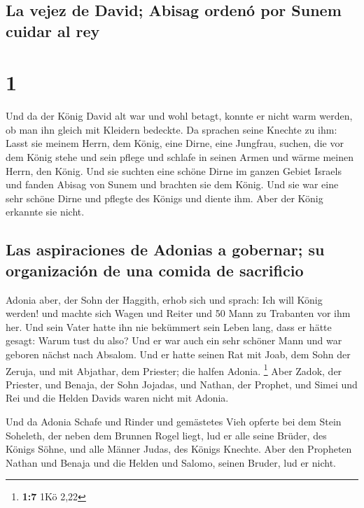 \hypertarget{la-vejez-de-david-abisag-ordenuxf3-por-sunem-cuidar-al-rey}{%
\subsection{La vejez de David; Abisag ordenó por Sunem cuidar al
rey}\label{la-vejez-de-david-abisag-ordenuxf3-por-sunem-cuidar-al-rey}}

\hypertarget{section}{%
\section{1}\label{section}}

 Und da der König David alt war und wohl betagt, konnte er
nicht warm werden, ob man ihn gleich mit Kleidern bedeckte.
 Da sprachen seine Knechte zu ihm: Lasst sie meinem Herrn,
dem König, eine Dirne, eine Jungfrau, suchen, die vor dem König stehe
und sein pflege und schlafe in seinen Armen und wärme meinen Herrn, den
König.  Und sie suchten eine schöne Dirne im ganzen Gebiet
Israels und fanden Abisag von Sunem und brachten sie dem König.
 Und sie war eine sehr schöne Dirne und pflegte des Königs
und diente ihm. Aber der König erkannte sie nicht.

\hypertarget{las-aspiraciones-de-adonias-a-gobernar-su-organizaciuxf3n-de-una-comida-de-sacrificio}{%
\subsection{Las aspiraciones de Adonias a gobernar; su organización de
una comida de
sacrificio}\label{las-aspiraciones-de-adonias-a-gobernar-su-organizaciuxf3n-de-una-comida-de-sacrificio}}

 Adonia aber, der Sohn der Haggith, erhob sich und sprach:
Ich will König werden! und machte sich Wagen und Reiter und 50 Mann zu
Trabanten vor ihm her.  Und sein Vater hatte ihn nie
bekümmert sein Leben lang, dass er hätte gesagt: Warum tust du also? Und
er war auch ein sehr schöner Mann und war geboren nächst nach Absalom.
 Und er hatte seinen Rat mit Joab, dem Sohn der Zeruja,
und mit Abjathar, dem Priester; die halfen Adonia. \footnote{\textbf{1:7}
  1Kö 2,22}  Aber Zadok, der Priester, und Benaja, der
Sohn Jojadas, und Nathan, der Prophet, und Simei und Rei und die Helden
Davids waren nicht mit Adonia.

 Und da Adonia Schafe und Rinder und gemästetes Vieh
opferte bei dem Stein Soheleth, der neben dem Brunnen Rogel liegt, lud
er alle seine Brüder, des Königs Söhne, und alle Männer Judas, des
Königs Knechte.  Aber den Propheten Nathan und Benaja und
die Helden und Salomo, seinen Bruder, lud er nicht.

